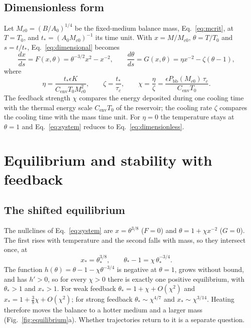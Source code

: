\documentclass[11pt,a4paper]{article}
\newcommand{\Pbb}{P_{\mathrm{bb}}}
\newcommand{\Mc}{M_{c0}}
\newcommand{\tstar}{t_*}
\newcommand{\Cenv}{C_{\mathrm{env}}}
\begin{document}
\subsection{Dimensionless form}
Let $\Mc=(B/A_0)^{1/4}$ be the fixed-medium balance mass, Eq.~\eqref{eq:mcrit}, at $T=T_0$, and $\tstar=(A_0\Mc)^{-1}$ its time unit. With $x=M/\Mc$, $\theta=T/T_0$ and $s=t/\tstar$, Eq.~\eqref{eq:dimensional} becomes
\begin{equation}
 \frac{dx}{ds}=F(x,\theta)=\theta^{-3/2}x^2-x^{-2},\qquad
 \frac{d\theta}{ds}=G(x,\theta)=\eta x^{-2}-\zeta(\theta-1),
 \label{eq:system}
\end{equation}
where
\begin{equation}
 \eta=\frac{\tstar\epsilon K}{\Cenv T_0\Mc^2},\qquad
 \zeta=\frac{\tstar}{\tau_c},\qquad
 \chi=\frac{\eta}{\zeta}=\frac{\epsilon\Pbb(\Mc)\,\tau_c}{\Cenv T_0}.
 \label{eq:params}
\end{equation}
The feedback strength $\chi$ compares the energy deposited during one cooling time with the thermal energy scale $\Cenv T_0$ of the reservoir; the cooling rate $\zeta$ compares the cooling time with the mass time unit. For $\eta=0$ the temperature stays at $\theta=1$ and Eq.~\eqref{eq:system} reduces to Eq.~\eqref{eq:dimensionless}.

\section{Equilibrium and stability with feedback}\label{sec:stability}
\subsection{The shifted equilibrium}
The nullclines of Eq.~\eqref{eq:system} are $x=\theta^{3/8}$ ($F=0$) and $\theta=1+\chi x^{-2}$ ($G=0$). The first rises with temperature and the second falls with mass, so they intersect once, at
\begin{equation}
 x_*=\theta_*^{3/8},\qquad \theta_*-1=\chi\,\theta_*^{-3/4}.
 \label{eq:equilibrium}
\end{equation}
The function $h(\theta)=\theta-1-\chi\theta^{-3/4}$ is negative at $\theta=1$, grows without bound, and has $h'>0$, so for every $\chi>0$ there is exactly one positive equilibrium, with $\theta_*>1$ and $x_*>1$. For weak feedback $\theta_*=1+\chi+O(\chi^2)$ and $x_*=1+\tfrac38\chi+O(\chi^2)$; for strong feedback $\theta_*\sim\chi^{4/7}$ and $x_*\sim\chi^{3/14}$. Heating therefore moves the balance to a hotter medium and a larger mass (Fig.~\ref{fig:equilibrium}a). Whether trajectories return to it is a separate question.
\end{document}
